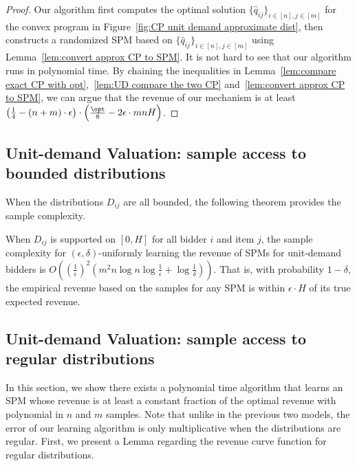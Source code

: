 \begin{proof}
	Our algorithm first computes the optimal solution $\{\hat{q}_{ij}\}_{i\in[n],j\in[m]}$ for the convex program in Figure~\ref{fig:CP unit demand approximate dist}, then  constructs a randomized SPM based on $\{\hat{q}_{ij}\}_{i\in[n],j\in[m]}$ using Lemma~\ref{lem:convert approx CP to SPM}. It is not hard to see that our algorithm runs in polynomial time. By chaining the inequalities in Lemma~\ref{lem:compare exact CP with opt},~\ref{lem:UD compare the two CP} and~\ref{lem:convert approx CP to SPM}, we can argue that the revenue of our mechanism is at least $\left(\frac{1}{4}-(n+m)\cdot \epsilon\right)\cdot\left(\frac{\opt}{8}-2\epsilon\cdot mnH\right)$.
\end{proof}

\subsection{Unit-demand Valuation: sample access to bounded distributions} 

When the distributions $D_{ij}$ are all bounded, the following theorem provides the sample complexity.
\begin{theorem}\cite{MorgensternR16}\label{thm:UD bounded}
	When $D_{ij}$ is supported on $[0,H]$ for all bidder $i$ and item $j$, the sample complexity for $(\epsilon,\delta)$-uniformly learning the revenue of SPMs for unit-demand bidders is $O\left(\left(\frac{1}{\epsilon}\right)^2 \left(m^2 n\log n\log \frac{1}{\epsilon} + \log \frac{1}{\delta}\right)\right)$. That is, with probability $1-\delta$, the empirical revenue based on the samples for any SPM is within $\epsilon\cdot H$ of its true expected revenue. %
	 \end{theorem}


\subsection{Unit-demand Valuation: sample access to regular distributions}
In this section, we show there exists a polynomial time algorithm that learns an SPM whose revenue is at least a constant fraction of the optimal revenue with polynomial in $n$ and $m$ samples. Note that unlike in the previous two models, the error of our learning algorithm is only multiplicative when the distributions are regular. First, we present a Lemma regarding the revenue curve function for regular distributions.


